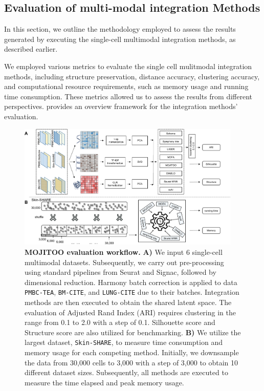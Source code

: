 \subsection{Evaluation of multi-modal integration Methods}
\label{MOJITOO:exp:metrics}
In this section, we outline the methodology employed to assess the results generated by executing the single-cell multimodal integration methods, as described earlier.


We employed various metrics to evaluate the single cell mulitmodal integration methods, including structure preservation, distance accuracy, clustering accuracy, and computational resource requirements, such as memory usage and running time consumption. These metrics allowed us to assess the results from different perspectives.  provides an overview framework for the integration methods' evaluation.
\begin{figure}[!ht]
	\centering
	\includegraphics[width=0.95\textwidth]{evaluation_MOJITOO/fig}
	\vspace{0.1cm}
	\caption[MOJITOO evaluation workflow]{
	\textbf{MOJITOO evaluation workflow.} \textbf{A)} We input 6 single-cell multimodal datasets. Subsequently, we carry out pre-processing using standard pipelines from Seurat and Signac, followed by dimensional reduction. Harmony batch correction is applied to data \texttt{PMBC-TEA}, \texttt{BM-CITE}, and \texttt{LUNG-CITE} due to their batches. Integration methods are then executed to obtain the shared latent space. The evaluation of Adjusted Rand Index (ARI) requires clustering in the range from 0.1 to 2.0 with a step of 0.1. Silhouette score and Structure score are also utilized for benchmarking. \textbf{B)} We utilize the largest dataset, \texttt{Skin-SHARE}, to measure time consumption and memory usage for each competing method. Initially, we downsample the data from 30,000 cells to 3,000 with a step of 3,000 to obtain 10 different dataset sizes. Subsequently, all methods are executed to measure the time elapsed and peak memory usage.} 
	\label{fig:evaluation_MOJITOO}
\end{figure}

